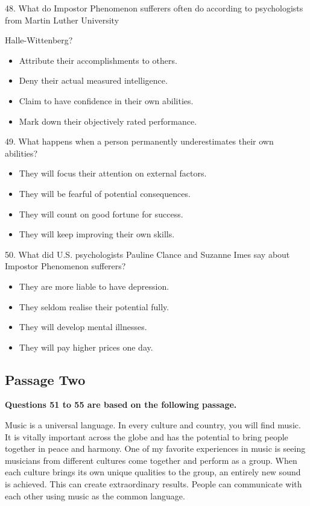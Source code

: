 \documentclass[UTF8,11pt]{ctexart}
\begin{document}
48. What do Impostor Phenomenon sufferers often do according to psychologists from Martin Luther University


Halle-Wittenberg?


\begin{itemize}[leftmargin=2em,itemsep=.2em,topsep=.4em]\item[A.] Attribute their accomplishments to others.
\item[B.] Deny their actual measured intelligence.
\item[C.] Claim to have confidence in their own abilities.
\item[D.] Mark down their objectively rated performance.
\end{itemize}

49. What happens when a person permanently underestimates their own abilities?


\begin{itemize}[leftmargin=2em,itemsep=.2em,topsep=.4em]\item[A.] They will focus their attention on external factors.
\item[B.] They will be fearful of potential consequences.
\item[C.] They will count on good fortune for success.
\item[D.] They will keep improving their own skills.
\end{itemize}

50. What did U.S. psychologists Pauline Clance and Suzanne Imes say about Impostor Phenomenon sufferers?


\begin{itemize}[leftmargin=2em,itemsep=.2em,topsep=.4em]\item[A.] They are more liable to have depression.
\item[B.] They seldom realise their potential fully.
\item[C.] They will develop mental illnesses.
\item[D.] They will pay higher prices one day.
\end{itemize}

\subsection*{\textbf{Passage Two}}


\textbf{Questions 51 to 55 are based on the following passage.}


Music is a universal language. In every culture and country, you will find music. It is vitally important across the globe and has the potential to bring people together in peace and harmony. One of my favorite experiences in music is seeing musicians from different cultures come together and perform as a group. When each culture brings its own unique qualities to the group, an entirely new sound is achieved. This can create extraordinary results. People can communicate with each other using music as the common language.
\end{document}
